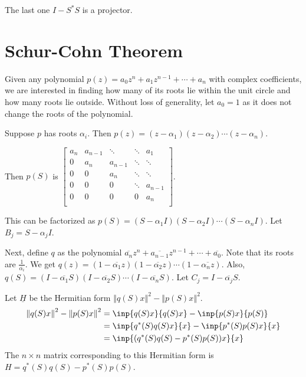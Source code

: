 \documentclass[twofold]{article}
\newcommand*\conj[1]{\overline{#1}}
\newcommand*\adj[1]{#1^*}
\newcommand*\norm[1]{\left \Vert #1 \right\Vert}
\theoremstyle{plain}
\theoremstyle{definition}
\theoremstyle{remark}
\begin{document}
The last one \(I - \adj{S} S\) is a projector. 


\section{Schur-Cohn Theorem}

Given any polynomial \(p(z) = a_0 z^n + a_1z^{n-1} + \cdots + a_n\) with complex coefficients, we are interested in finding how many of its roots lie within the unit circle and how many roots lie outside. Without loss of generality, let \(a_0 = 1\) as it does not change the roots of the polynomial. 

Suppose \(p\) has roots \(\alpha_i\). Then \(p(z) = (z - \alpha_1) (z - \alpha_2) \cdots (z - \alpha_n)\). 

 Then \(p(S) \) is \( \begin{bmatrix} 

a_n & a_{n-1} & \ddots & \ddots & a_1 \\
0 & a_n & a_{n-1} & \ddots & \ddots \\
0 & 0 & a_n & \ddots & \ddots \\
0 & 0 & 0 &\ddots & a_{n-1} \\
0 & 0 & 0 & 0 & a_n \\ 
\end{bmatrix}\). 


This can be factorized as \(p(S) = (S - \alpha_1I) (S - \alpha_2 I) \cdots (S - \alpha_n I)\). Let \(B_j = S - \alpha_jI\).

Next, define \(q\) as the polynomial \(\conj{a_n}z^n + \conj{a_{n-1}}z^{n-1} + \cdots + \conj{a_0}\). Note that its roots are \(\frac {1}{\conj{\alpha_i}}\). We get \(q(z) = (1 - \conj{\alpha_1}z) (1 - \conj{\alpha_2}z) \cdots (1 - \conj{\alpha_nz})\). Also, \(q(S) = (I - \conj{\alpha_1}S) (I - \conj{\alpha_2}S) \cdots (I - \conj{\alpha_n}S)\). Let \(C_j= I -  \conj{\alpha_j} S\).


Let \(\underline{H}\) be the Hermitian form \(\norm{ q(S) x }^2 - \norm{ p(S) x}^2\). 
\begin{equation*} \begin{split}
\norm{ q(S) x }^2 - \norm{ p(S) x}^2 &= \inp{q(S)x}{q(S)x} - \inp{p(S)x}{p(S)} \\
& = \inp{\adj{q}(S) q(S) x}{x} - \inp{\adj{p}(S) p(S) x}{x} \\
& = \inp{(\adj{q}(S) q(S) - \adj{p} (S) p(S) ) x}{x} \\
\end{split} \end{equation*}
The \(n \times n\) matrix corresponding to this Hermitian form is  \(H = \adj{q}(S) q(S) - \adj{p}(S) p(S)\).
\end{document}
